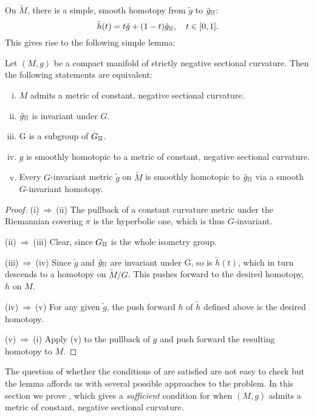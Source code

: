 \documentclass[a4paper,12pt]{amsart}
\begin{document}
On \(\tilde{M}\), there is a simple, smooth homotopy from \(\tilde{g}\) to \(\tilde{g}_{\mathbb{H}}\):
\[
\tilde{h}(t) = t\tilde{g} + (1-t)\tilde{g}_{\mathbb{H}}, \quad t \in [0, 1].
\]
This gives rise to the following simple lemma:

\begin{lemma}
\label{lem:const_neg}

Let \((M, g)\) be a compact manifold of strictly negative sectional curvature. Then the following statements are equivalent:
\begin{enumerate}[(i)]
\item \label{enum:neg_met} \(M\) admits a metric of constant, negative sectional curvature.
\item \label{enum:deck_met} \(\tilde{g}_{\mathbb{H}}\) is invariant under \(G\).
\item \label{enum:subgroup} G is a subgroup of \(G_{\mathbb{H}}\).
\item \label{enum:homo_met} \(g\) is smoothly homotopic to a metric of constant, negative sectional curvature.
\item \label{enum:homo_deck} Every \(G\)-invariant metric \(\tilde{g}\) on \(\tilde{M}\) is smoothly homotopic to \(\tilde{g}_{\mathbb{H}}\) via a smooth \(G\)-invariant homotopy.
\end{enumerate}
\end{lemma}

\begin{proof}
(i)\(\ \Rightarrow\ \)(ii)
The pullback of a constant curvature metric under the Riemannian covering $\pi$ is the hyperbolic one, which is thus \(G\)-invariant.

(ii)\(\ \Rightarrow\ \)(iii)
Clear, since \(G_{\mathbb{H}}\) is the whole isometry group.

(iii)\(\ \Rightarrow\ \)(iv)
Since \(\tilde{g}\) and \(\tilde{g}_{\mathbb{H}}\) are invariant under G, so is \(\tilde{h}(t)\), which in turn descends to a homotopy on \(\tilde{M}/G\). This pushes forward to the desired homotopy, \(h\) on \(M\).

(iv)\(\ \Rightarrow\ \)(v)
For any given \(\tilde{g}\), the push forward \(h\) of \(\tilde{h}\) defined above is the desired homotopy.

(v)\(\ \Rightarrow\ \)(i)
Apply (v) to the pullback of \(g\) and push forward the resulting homotopy to \(M\).
\end{proof}

The question of whether the conditions of  are satisfied are not easy to check but the lemma affords us with several possible approaches to the problem. In this section we prove  , which gives a \emph{sufficient} condition for when \((M, g)\) admits a metric of constant, negative sectional curvature.
\end{document}
